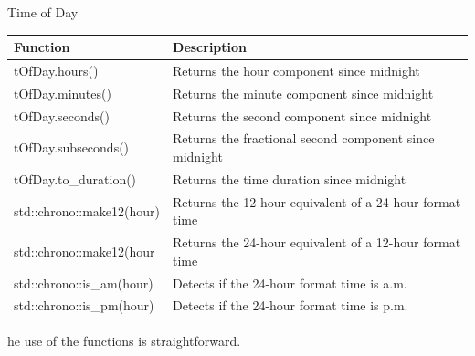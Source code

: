 \begin{center}
Time of Day
\end{center}

\begin{table}[H]
\centering
\begin{tabular}{ll}
\textbf{Function}         & \textbf{Description}                        \\ \hline
tOfDay.hours()            & Returns the hour component since midnight   \\
tOfDay.minutes()          & Returns the minute component since midnight \\
tOfDay.seconds()          & Returns the second component since midnight \\
tOfDay.subseconds()       & Returns the fractional second component since midnight  \\
tOfDay.to\_duration()     & Returns the time duration since midnight    \\
std::chrono::make12(hour) & Returns the 12-hour equivalent of a 24-hour format time \\
std::chrono::make12(hour  & Returns the 24-hour equivalent of a 12-hour format time \\
std::chrono::is\_am(hour) & Detects if the 24-hour format time is a.m.  \\
std::chrono::is\_pm(hour) & Detects if the 24-hour format time is p.m. 
\end{tabular}
\end{table}


he use of the functions is straightforward.

